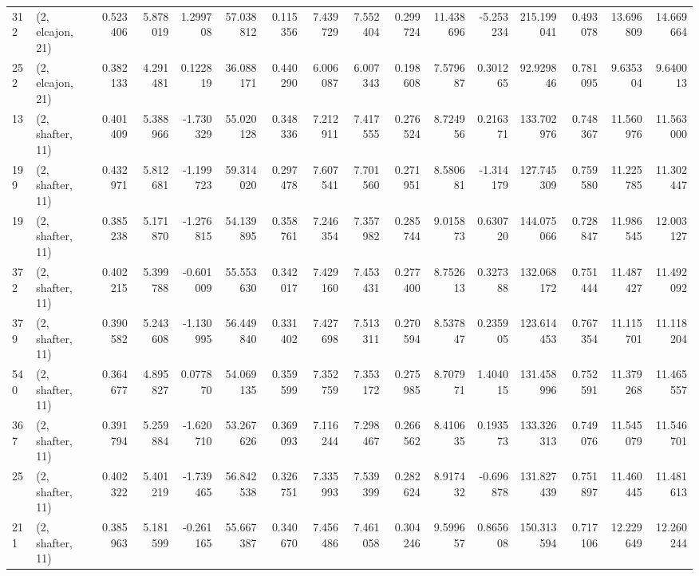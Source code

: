 \begin{tabular}{llrrrrrrrrrrrrrr}
312 &  (2, elcajon, 21) &   0.523406 &   5.878019 &   1.299708 &    57.038812 &   0.115356 &   7.439729 &   7.552404 &  0.299724 &  11.438696 &  -5.253234 &   215.199041 &  0.493078 &  13.696809 &  14.669664 \\
252 &  (2, elcajon, 21) &   0.382133 &   4.291481 &   0.122819 &    36.088171 &   0.440290 &   6.006087 &   6.007343 &  0.198608 &   7.579687 &   0.301265 &    92.929846 &  0.781095 &   9.635304 &   9.640013 \\
13  &  (2, shafter, 11) &   0.401409 &   5.388966 &  -1.730329 &    55.020128 &   0.348336 &   7.212911 &   7.417555 &  0.276524 &   8.724956 &   0.216371 &   133.702976 &  0.748367 &  11.560976 &  11.563000 \\
199 &  (2, shafter, 11) &   0.432971 &   5.812681 &  -1.199723 &    59.314020 &   0.297478 &   7.607541 &   7.701560 &  0.271951 &   8.580681 &  -1.314179 &   127.745309 &  0.759580 &  11.225785 &  11.302447 \\
19  &  (2, shafter, 11) &   0.385238 &   5.171870 &  -1.276815 &    54.139895 &   0.358761 &   7.246354 &   7.357982 &  0.285744 &   9.015873 &   0.630720 &   144.075066 &  0.728847 &  11.986545 &  12.003127 \\
372 &  (2, shafter, 11) &   0.402215 &   5.399788 &  -0.601009 &    55.553630 &   0.342017 &   7.429160 &   7.453431 &  0.277400 &   8.752613 &   0.327388 &   132.068172 &  0.751444 &  11.487427 &  11.492092 \\
379 &  (2, shafter, 11) &   0.390582 &   5.243608 &  -1.130995 &    56.449840 &   0.331402 &   7.427698 &   7.513311 &  0.270594 &   8.537847 &   0.235905 &   123.614453 &  0.767354 &  11.115701 &  11.118204 \\
540 &  (2, shafter, 11) &   0.364677 &   4.895827 &   0.077870 &    54.069135 &   0.359599 &   7.352759 &   7.353172 &  0.275985 &   8.707971 &   1.404015 &   131.458996 &  0.752591 &  11.379268 &  11.465557 \\
367 &  (2, shafter, 11) &   0.391794 &   5.259884 &  -1.620710 &    53.267626 &   0.369093 &   7.116244 &   7.298467 &  0.266562 &   8.410635 &   0.193573 &   133.326313 &  0.749076 &  11.545079 &  11.546701 \\
25  &  (2, shafter, 11) &   0.402322 &   5.401219 &  -1.739465 &    56.842538 &   0.326751 &   7.335993 &   7.539399 &  0.282624 &   8.917432 &  -0.696878 &   131.827439 &  0.751897 &  11.460445 &  11.481613 \\
211 &  (2, shafter, 11) &   0.385963 &   5.181599 &  -0.261165 &    55.667387 &   0.340670 &   7.456486 &   7.461058 &  0.304246 &   9.599657 &   0.865608 &   150.313594 &  0.717106 &  12.229649 &  12.260244 \\

\end{tabular}
